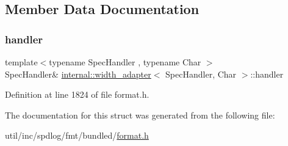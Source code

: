 \subsection{Member Data Documentation}
\mbox{\label{structinternal_1_1width__adapter_a59aef299a378b11fca5f9f46ebfd63b2}} 
\subsubsection{\texorpdfstring{handler}{handler}}
{\footnotesize\ttfamily template$<$typename Spec\+Handler , typename Char $>$ \\
Spec\+Handler\& \hyperlink{structinternal_1_1width__adapter}{internal\+::width\+\_\+adapter}$<$ Spec\+Handler, Char $>$\+::handler}



Definition at line 1824 of file format.\+h.



The documentation for this struct was generated from the following file\+:\begin{DoxyCompactItemize}
\item 
util/inc/spdlog/fmt/bundled/\hyperlink{format_8h}{format.\+h}\end{DoxyCompactItemize}
